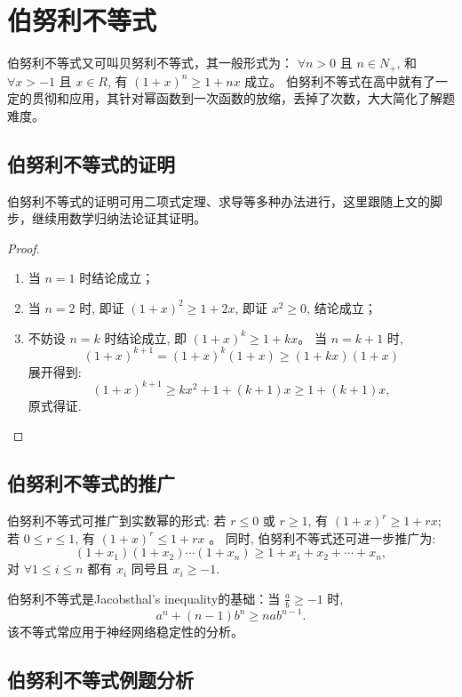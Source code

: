 \chapter{伯努利不等式}

伯努利不等式又可叫贝努利不等式，其一般形式为：
$\forall n>0$ 且 $n \in N_{+}$, 和 $\forall x>-1$ 且 $x \in R$, 有 $(1+x)^{n} \geq 1+n x$ 成立。
伯努利不等式在高中就有了一定的贯彻和应用，其针对幂函数到一次函数的放缩，丢掉了次数，大大简化了解题难度。


\section{伯努利不等式的证明}

伯努利不等式的证明可用二项式定理、求导等多种办法进行，这里跟随上文的脚步，继续用数学归纳法论证其证明。

\begin{proof}
  \begin{enumerate}
    \item 当 $n=1$ 时结论成立；
    \item 当 $n=2$ 时, 即证 $(1+x)^{2} \geq 1+2 x$, 即证 $x^{2} \geq 0$, 结论成立；
    \item 不妨设 $n=k$ 时结论成立, 即 $(1+x)^{k} \geq 1+k x$。
    当 $n=k+1$ 时, \[(1+x)^{k+1}=(1+x)^{k}(1+x) \geq(1+k x)(1+x)\]
    展开得到: \[(1+x)^{k+1} \geq k x^{2}+1+(k+1) x \geq 1+(k+1) x,\] 原式得证. \qedhere
  \end{enumerate}
\end{proof}



\section{伯努利不等式的推广}

伯努利不等式可推广到实数幂的形式: 若 $r \leq 0$ 或 $r \geq 1$, 有 $(1+x)^{r} \geq 1+ r x;$ 若 $0 \leq r \leq 1$, 有 $(1+x)^{r} \leq 1+r x$ 。 同时, 伯努利不等式还可进一步推广为: \[\left(1+x_{1}\right)\left(1+x_{2}\right) \cdots\left(1+x_{n}\right) \geq 1+x_{1}+x_{2}+\cdots+x_{n},\] 对 $\forall 1 \leq i \leq n$ 都有 $x_{i}$ 同号且 $x_{i} \geq-1$.

伯努利不等式是Jacobsthal’s inequality的基础：当 $\frac{a}{b} \geq-1$ 时, \[a^{n}+(n-1) b^{n} \geq n a b^{n-1}.\]
该不等式常应用于神经网络稳定性的分析。


\section{伯努利不等式例题分析}


